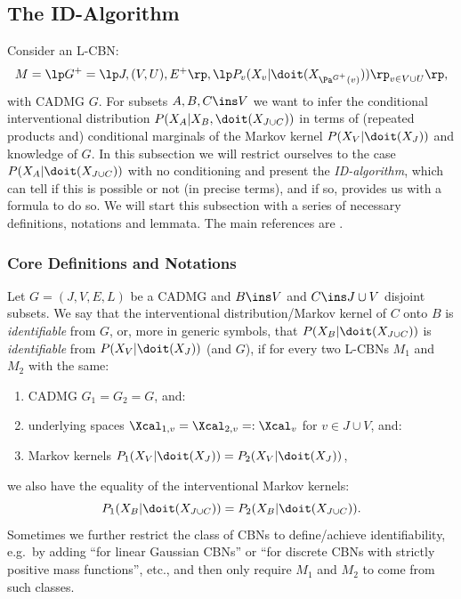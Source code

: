 
\subsection{The ID-Algorithm}


        Consider an L-CBN:
            \[M= \lp G^+=\lp J,(V,U),E^+ \rp, \lp P_v ( X_v|\doit( X_{\Pa^{G^+}(v)})) \rp_{v \in V \cup U} \rp,\]
        with \observational CADMG $G$.
        For subsets $A,B,C \ins V$ we want to infer the conditional interventional distribution $P(X_A|X_B,\doit(X_{J \cup C}))$ 
        in terms of (repeated products and) conditional marginals of the \observational Markov kernel $P(X_V|\doit(X_J))$ 
        and knowledge of $G$. 
        In this subsection we will restrict ourselves to the case $P(X_A|\doit(X_{J \cup C}))$ with no conditioning and 
        present the \emph{ID-algorithm}, which can tell if this is possible or not (in precise terms), 
        and if so, provides us with a formula to do so. 
        We will start this subsection with a series of necessary definitions, notations and lemmata.
        The main references are \cite{Pearl09,GP95s,Tian2002,TP02s,Tian04s,SP06,HV06s,HV08s,RERS17,FM20}.

\subsubsection{Core Definitions and Notations}

\begin{Def} 
    \label{def:id-causal-effect}
    Let $G=(J,V,E,L)$ be a CADMG and $B \ins V$ and $C \ins J \cup V$ disjoint subsets.
    We say that the interventional distribution/Markov kernel of $C$ onto $B$ is \emph{identifiable} from $G$,
    or, more in generic symbols, that $P(X_B|\doit(X_{J \cup C}))$ is \emph{identifiable} from $P(X_V|\doit(X_J))$ (and $G$),
    if for every two L-CBNs $M_1$ and $M_2$ with the same:
    \begin{enumerate}
        \item \observational CADMG $G_1=G_2=G$, and: 
        \item underlying spaces $\Xcal_{1,v}=\Xcal_{2,v}=:\Xcal_v$ for $v \in J \cup V$, and:
        \item \observational Markov kernels $P_1(X_V|\doit(X_J)) =P_2(X_V|\doit(X_J))$,
    \end{enumerate}
    we also have the equality of the interventional Markov kernels:
    \[ P_1(X_B|\doit(X_{J \cup C})) = P_2(X_B|\doit(X_{J \cup C})). \]
    Sometimes we further restrict the class of CBNs to define/achieve identifiability, e.g.\ by adding
    ``for linear Gaussian CBNs'' or ``for discrete CBNs with strictly positive mass functions'', etc., and then only require $M_1$ and $M_2$ 
    to come from such classes.
\end{Def}

